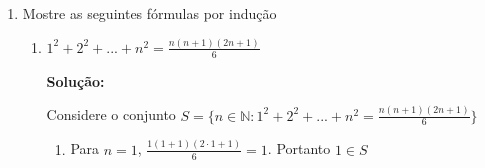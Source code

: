 \documentclass[
  12pt,
  openright,
  a4paper,
  twoside,
  english,
  brazil,
]{article}
\begin{document}
\begin{enumerate}[\bfseries  1.]
\begin{enumerate}[\bfseries (a)]
\begin{enumerate}[1.]
            Logo, $s(k)\in S$. E pelo Princípio da Indução Finita a
            propriedade é verdadeira para todos os números naturais.

        \end{enumerate}

      \item $(a\cdot b)^n=a^n \cdot b^n$

        \textbf{Solução:}

        Considere o conjunto $S=\{n\in\mathbb N^*:(a\cdot b)^n=a^n\cdot b^n\}$

        \begin{enumerate}[$1.$]
          \item Para $n=1$, $(a\cdot b)^1=a\cdot b=a^1\cdot b^1$.
            Portanto $1\in S$

          \item Suponha que $k\in S$ tal que $(a\cdot b)^k=a^k\cdot b^k$.

            Multiplicamos ambos os lados por $(a\cdot b)$ e desenvolvendo:
            $$
            (a\cdot b)^k(a\cdot b)=a^k\cdot b^k\cdot a\cdot b
            $$

            $$
            (a\cdot b)^{k+1}=(a^k\cdot a)\cdot
            (b^k\cdot b)=a^{k+1}\cdot b^{k+1}
            $$

            $$
            (a\cdot b)^{s(k)}=(a^k\cdot a)\cdot
            (b^k\cdot b)=a^{s(k)}\cdot b^{s(k)}
            $$

            Portanto $s(k)\in S$. E pelo Princípio da Indução Finita,
            é verdadeiro para todos os números naturais.

        \end{enumerate}
    \end{enumerate}

  \item Mostre as seguintes fórmulas por indução

    \begin{enumerate}[\bfseries (a)]
      \item $1^2+2^2+...+n^2=\frac{n(n+1)(2n+1)}{6}$

        \textbf{Solução:}

        Considere o conjunto $S=\{n\in\mathbb
        N:1^2+2^2+...+n^2=\frac{n(n+1)(2n+1)}{6}\}$

        \begin{enumerate}[$1.$]
          \item Para $n=1$, $\frac{1(1+1)(2\cdot 1+1)}{6}=1$. Portanto $1\in S$


\end{enumerate}
\end{enumerate}
\end{enumerate}
\end{document}
